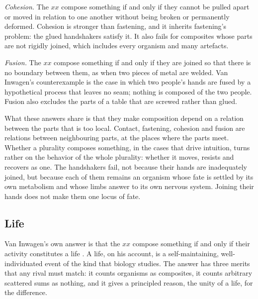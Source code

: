 \documentclass{situationist-preprint}
\begin{document}
\emph{Cohesion.} The $xx$ compose something if and only if they cannot be pulled apart or moved in relation to one another without being broken or permanently deformed. Cohesion is stronger than fastening, and it inherits fastening's problem: the glued handshakers satisfy it. It also fails for composites whose parts are not rigidly joined, which includes every organism and many artefacts.

\emph{Fusion.} The $xx$ compose something if and only if they are joined so that there is no boundary between them, as when two pieces of metal are welded. Van Inwagen's counterexample is the case in which two people's hands are fused by a hypothetical process that leaves no seam; nothing is composed of the two people. Fusion also excludes the parts of a table that are screwed rather than glued.

What these answers share is that they make composition depend on a relation between the parts that is too local. Contact, fastening, cohesion and fusion are relations between neighbouring parts, at the places where the parts meet. Whether a plurality composes something, in the cases that drive intuition, turns rather on the behavior of the whole plurality: whether it moves, resists and recovers as one. The handshakers fail, not because their hands are inadequately joined, but because each of them remains an organism whose fate is settled by its own metabolism and whose limbs answer to its own nervous system. Joining their hands does not make them one locus of fate.

\subsection{Life}

Van Inwagen's own answer is that the $xx$ compose something if and only if their activity constitutes a life \citep{vanInwagen1990}. A life, on his account, is a self-maintaining, well-individuated event of the kind that biology studies. The answer has three merits that any rival must match: it counts organisms as composites, it counts arbitrary scattered sums as nothing, and it gives a principled reason, the unity of a life, for the difference.
\end{document}
